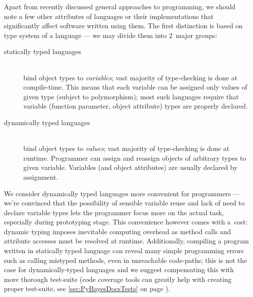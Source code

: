 Apart from recently discussed general approaches to programming, we should note a few other
attributes of languages or their implementations that significantly affect software written using
them. The first distinction is based on type system of a language --- we may divide them into
2~major groups:
\begin{description}
	\item[statically typed languages] \hfill {} \label{desc:StaticTyping} \\
		bind object types to \emph{variables}; vast majority of type-checking is done at
		compile-time. This
		means that each variable can be assigned only values of given type (subject to
		polymorphism); most such languages require that variable (function parameter, object
		attribute) types are properly declared.
	\item[dynamically typed languages] \hfill {} \label{desc:DynamicTyping} \\
		bind object types to \emph{values}; vast majority of type-checking is done at runtime.
		Programmer can assign and reassign objects of arbitrary types to given variable. Variables
		(and object attributes) are usually declared by assignment.
\end{description}
We consider dynamically typed languages more convenient for programmers --- we're convinced that the
possibility of sensible variable reuse and lack of need to declare variable types lets the
programmer focus more on the actual task, especially during prototyping stage. This convenience however
comes with a~cost: dynamic typing imposes inevitable computing overhead as method calls and
attribute accesses must be resolved at runtime. Additionally, compiling a program written in statically
typed language can reveal many simple programming errors such as calling mistyped methods, even
in unreachable code-paths; this is not the case for dynamically-typed languages and we suggest
compensating this with more thorough test-suite (code coverage tools can greatly help with creating
proper test-suite, see \autoref{sec:PyBayesDocsTests} on page \pageref{sec:PyBayesDocsTests}).

